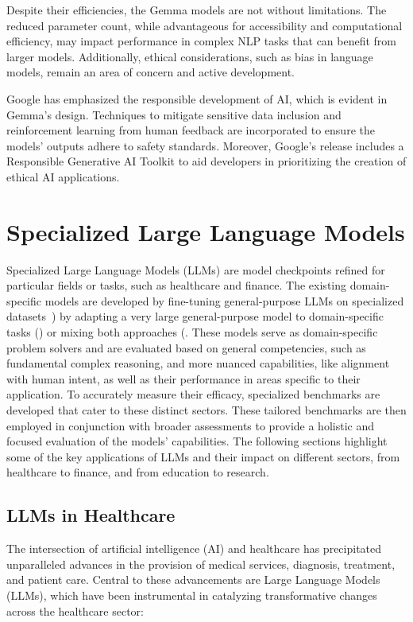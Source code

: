 Despite their efficiencies, the Gemma models are not without limitations.
The reduced parameter count, while advantageous for accessibility and computational efficiency, may impact performance in complex NLP tasks that can benefit from larger models.
Additionally, ethical considerations, such as bias in language models, remain an area of concern and active development.

Google has emphasized the responsible development of AI, which is evident in Gemma's design.
Techniques to mitigate sensitive data inclusion and reinforcement learning from human feedback are incorporated to ensure the models' outputs adhere to safety standards.
Moreover, Google's release includes a Responsible Generative AI Toolkit to aid developers in prioritizing the creation of ethical AI applications.


\section{Specialized Large Language Models}
\label{sec:applications-of-large-language-models}

Specialized Large Language Models (LLMs) are model checkpoints refined for particular fields or tasks, such as healthcare and finance.
The existing domain-specific models are developed by fine-tuning general-purpose LLMs on specialized datasets~\cite{luo2022biogpt,bolton2023biomedlm, taylor2022galactica}) by adapting a very large general-purpose model to domain-specific tasks (\textcite{singhal2022large, liang2022holistic}) or mixing both approaches (\textcite{wu2023bloomberggpt}.
These models serve as domain-specific problem solvers and are evaluated based on general competencies, such as fundamental complex reasoning, and more nuanced capabilities, like alignment with human intent, as well as their performance in areas specific to their application.
To accurately measure their efficacy, specialized benchmarks are developed that cater to these distinct sectors.
These tailored benchmarks are then employed in conjunction with broader assessments to provide a holistic and focused evaluation of the models' capabilities.
The following sections highlight some of the key applications of LLMs and their impact on different sectors, from healthcare to finance, and from education to research.

\subsection{LLMs in Healthcare}
\label{subsec:llms-in-healthcare}
The intersection of artificial intelligence (AI) and healthcare has precipitated unparalleled advances in the provision of medical services, diagnosis, treatment, and patient care.
Central to these advancements are Large Language Models (LLMs), which have been instrumental in catalyzing transformative changes across the healthcare sector:

